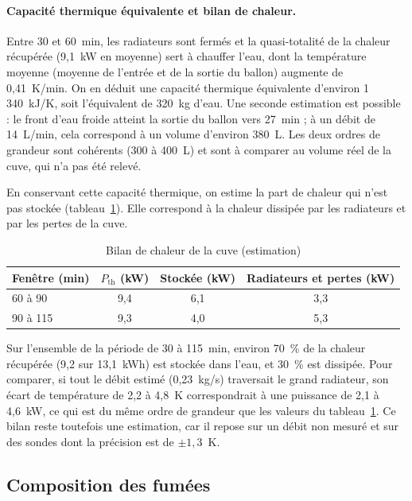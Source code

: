 \paragraph{Capacité thermique équivalente et bilan de chaleur.}
Entre 30 et 60~min, les radiateurs sont fermés et la quasi-totalité de
la chaleur récupérée (9,1~kW en moyenne) sert à chauffer l'eau, dont la
température moyenne (moyenne de l'entrée et de la sortie du ballon)
augmente de 0,41~K/min. On en déduit une capacité thermique équivalente
d'environ 1\,340~kJ/K, soit l'équivalent de 320~kg d'eau. Une seconde
estimation est possible : le front d'eau froide atteint la sortie du
ballon vers 27~min ; à un débit de 14~L/min, cela correspond à un
volume d'environ 380~L. Les deux ordres de grandeur sont cohérents
(300 à 400~L) et sont à comparer au volume réel de la cuve, qui n'a pas
été relevé.

En conservant cette capacité thermique, on estime la part de chaleur
qui n'est pas stockée (tableau~\ref{tab:bilan_cuve}). Elle correspond à
la chaleur dissipée par les radiateurs et par les pertes de la cuve.

\begin{table}[htbp]
  \centering
  \caption{Bilan de chaleur de la cuve (estimation)}
  \label{tab:bilan_cuve}
  \begin{tabular}{lccc}
    \toprule
    Fenêtre (min) & $P_{\mathrm{th}}$ (kW) & Stockée (kW) & Radiateurs et pertes (kW) \\
    \midrule
    60 à 90  & 9,4 & 6,1 & 3,3 \\
    90 à 115 & 9,3 & 4,0 & 5,3 \\
    \bottomrule
  \end{tabular}
\end{table}

Sur l'ensemble de la période de 30 à 115~min, environ 70~\% de la
chaleur récupérée (9,2 sur 13,1~kWh) est stockée dans l'eau, et 30~\%
est dissipée. Pour comparer, si tout le débit estimé (0,23~kg/s)
traversait le grand radiateur, son écart de température de 2,2 à 4,8~K
correspondrait à une puissance de 2,1 à 4,6~kW, ce qui est du même ordre
de grandeur que les valeurs du tableau~\ref{tab:bilan_cuve}. Ce bilan
reste toutefois une estimation, car il repose sur un débit non mesuré
et sur des sondes dont la précision est de $\pm 1{,}3$~K.

\subsection{Composition des fumées}
\label{sec:fumees}

